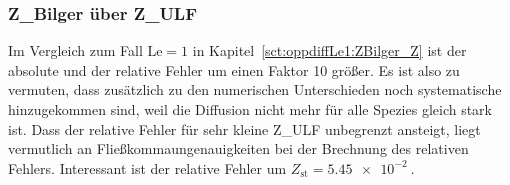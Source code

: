 %

\subsubsection{\texorpdfstring{\gls{Z_Bilger}}{ZBilger} über \texorpdfstring{\gls{Z_ULF}}{ZULF}}
\label{sct:opplevar:ZBilger-ZUlf}

Im Vergleich zum Fall $\mathrm{Le}=1$ in Kapitel~\ref{sct:oppdiffLe1:ZBilger_Z} ist der absolute und der relative Fehler um einen Faktor 10 größer. Es ist also zu vermuten, dass zusätzlich zu den numerischen Unterschieden noch systematische hinzugekommen sind, weil die Diffusion nicht mehr für alle Spezies gleich stark ist.
Dass der relative Fehler für sehr kleine \gls{Z_ULF} unbegrenzt ansteigt, liegt vermutlich an Fließkommaungenauigkeiten bei der Brechnung des relativen Fehlers. Interessant ist der relative Fehler um $Z_\mathrm{st}=\SI{5.45e-2}{}$.

